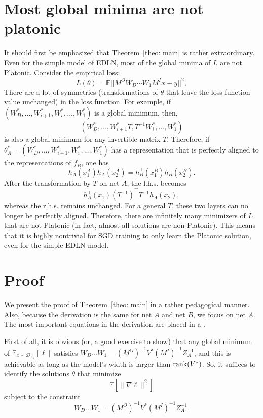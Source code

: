 \documentclass[11pt]{article}
\theoremstyle{plain}
\newcommand{\E}{\mathbb{E}}
\begin{document}
\section{Most global minima are not platonic}\label{sec: most solutions are not platonic}
It should first be emphasized that Theorem~\ref{theo: main} is rather extraordinary. Even for the simple model of EDLN, most of the global minima of $L$ are not Platonic.
Consider the empirical loss:
\begin{equation}
L(\theta)= \E ||M^OW_D\cdots W_1M^I x-y||^2,
\end{equation}
There are a lot of symmetries (transformations of $\theta$ that leave the loss function value unchanged) in the loss function. For example, if $(W_D^*,..., W_{i+1}^*, W_i^*,...,W_1^*)$ is a global minimum, then, 
\begin{equation}
    (W_D^*,..., W_{i+1}^* T, T^{-1}W_i^*,...,W_1^*)
\end{equation}
is also a global minimum for any invertible matrix $T$. Therefore, if $\theta^*_A = (W_D^*,..., W_{i+1}^*, W_i^*,...,W_1^*)$ has a representation that is perfectly aligned to the representations of $f_B$, one has
\begin{equation}
    h_A^\top(x_1^A)h_A(x_2^A) =  h_B^\top(x_1^B)h_B(x_2^B).
\end{equation}
After the transformation by $T$ on net $A$, the l.h.s. becomes 
\begin{equation}
    h_A^\top(x_1)(T^{-1})^{\top} T^{-1} h_A(x_2),
\end{equation}
whereas the r.h.s. remains unchanged. For a general $T$, these two layers can no longer be perfectly aligned. Therefore, there are infinitely many minimizers of $L$ that are not Platonic (in fact, almost all solutions are non-Platonic). This means that it is highly nontrivial for SGD training to only learn the Platonic solution, even for the simple EDLN model. 

\section{Proof}%
We present the proof of Theorem~\ref{theo: main} in a rather pedagogical manner. Also, because the derivation is the same for net $A$ and net $B$, we focus on net $A$. The most important equations in the derivation are placed in a .

First of all, it is obvious (or, a good exercise to show) that any global minimum of $\E_{x\sim \mathcal{D}_{Z_A}} [\ell]$ satisfies $W_D...W_1 = (M^O)^{-1} V^* (M^I)^{-1} Z_A^{-1}$, and this is achievable as long as the model's width is larger than ${\rm rank}(V^*)$. So, it suffices to identify the solutions $\theta$ that minimize
\begin{equation}
    \E[\|\nabla \ell\|^2] 
\end{equation}
subject to the constraint 
\begin{equation}\label{eq: L minimum}
    W_D...W_1 = (M^O)^{-1} V^* (M^I)^{-1} Z_A^{-1}.
\end{equation}
\end{document}
